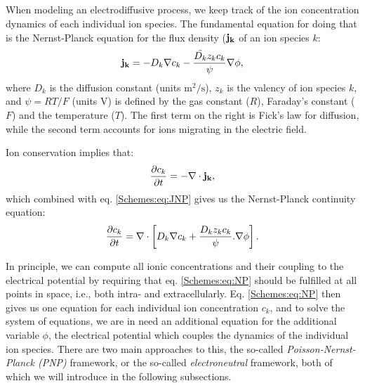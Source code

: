 

\subsection{}
\label{sec:Schemes:complete}
When modeling an electrodiffusive process, we keep track of the ion concentration dynamics of each individual ion species. The fundamental equation for doing that is the Nernst-Planck equation for the flux density (${\bf j_k}$ of an ion species $k$:
\begin{equation}
{\bf j_k} = - D_k {\bf \nabla} c_{k} - \frac{\tilde{D_k} z_k c_k}{\psi} {\bf \nabla} \phi, 
\label{Schemes:eq:JNP}
\end{equation}
where ${D}_k$ is the diffusion constant (units $\mathrm{m^2/s}$), $z_{k}$ is the valency of ion species $k$, and $\psi=RT/F$ (units V) is defined by the gas constant ($R$), Faraday's constant ($F$) and the temperature ($T$). The first term on the right is Fick's law for diffusion, while the second term accounts for ions migrating in the electric field. 

Ion conservation implies that:
\begin{equation}
\frac{\partial c_k}{\partial t} = -\nabla \cdot {\bf j_k},
\label{Schemes:eq:general_ionconservation}
\end{equation}
which combined with eq. \ref{Schemes:eq:JNP} gives us the Nernst-Planck continuity equation:
\begin{equation}
\frac{\partial c_k}{\partial t} = {\bf \nabla} \cdot \left[{D_k} {\bf \nabla} c_k + \frac{D_k z_k c_k}{\psi}. {\bf \nabla} \phi \right].
\label{Schemes:eq:NP}
\end{equation}

In principle, we can compute all ionic concentrations and their coupling to the electrical potential by requiring that eq. \ref{Schemes:eq:NP} should be fulfilled at all points in space, i.e., both intra- and extracellularly. Eq. \ref{Schemes:eq:NP} then gives us one equation for each individual ion concentration $c_k$, and to solve the system of equations, we are in need an additional equation for the additional variable $\phi$, the electrical potential which couples the dynamics of the individual ion species. There are two main approaches to this, the so-called \textit{Poisson-Nernst-Planck (PNP)} framework, or the so-called \textit{electroneutral} framework, both of which we will introduce in the following subsections. 


